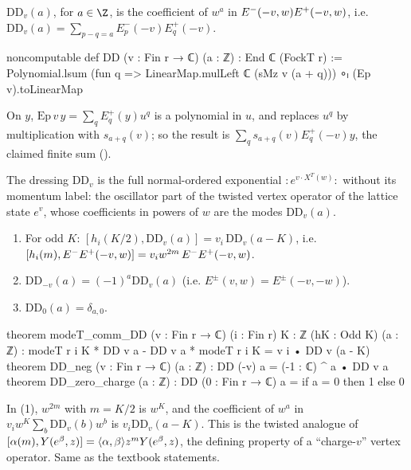 \begin{definition}[Dressing]\label{ch08:def:DD}
$\mathrm{DD}_v(a)$, for $a\in\Z$, is the coefficient of $w^a$ in
$E^{-}(-v,w)E^{+}(-v,w)$, i.e. $\mathrm{DD}_v(a)=\sum_{p-q=a}E^-_p(-v)E^+_q(-v)$.
\end{definition}
\begin{leancode}
noncomputable def DD (v : Fin r → ℂ) (a : ℤ) : End ℂ (FockT r) :=
  Polynomial.lsum (fun q => LinearMap.mulLeft ℂ (sMz v (a + q))) ∘ₗ (Ep v).toLinearMap
\end{leancode}
\begin{dictionary}
On $y$, $\mathrm{Ep}\,v\,y=\sum_qE^+_q(y)u^q$ is a polynomial in $u$, and 
replaces $u^q$ by multiplication with $s_{a+q}(v)$; so the result is
$\sum_qs_{a+q}(v)E^+_q(-v)y$, the claimed finite sum ().
\end{dictionary}

\begin{physics}
The dressing $\mathrm{DD}_v$ is the full normal-ordered exponential $:\!e^{v\cdot X^{T}(w)}\!:$ without its momentum label: the oscillator part of the twisted vertex operator of the lattice state $e^v$, whose coefficients in powers of $w$ are the modes $\mathrm{DD}_v(a)$.
\end{physics}

\begin{proposition}\label{ch08:prop:DD}
\begin{enumerate}
\item For odd $K$: $[h_i(K/2),\mathrm{DD}_v(a)]=v_i\,\mathrm{DD}_v(a-K)$, i.e.
  $[h_i(m),E^{-}E^{+}(-v,w)]=v_iw^{2m}\,E^{-}E^{+}(-v,w)$.
\item $\mathrm{DD}_{-v}(a)=(-1)^a\mathrm{DD}_v(a)$ (i.e. $E^\pm(v,w)=E^\pm(-v,-w)$).
\item $\mathrm{DD}_0(a)=\delta_{a,0}$.
\end{enumerate}
\end{proposition}
\begin{leancode}
theorem modeT_comm_DD (v : Fin r → ℂ) (i : Fin r) {K : ℤ} (hK : Odd K) (a : ℤ) :
    modeT r i K * DD v a - DD v a * modeT r i K = v i • DD v (a - K)
theorem DD_neg (v : Fin r → ℂ) (a : ℤ) : DD (-v) a = (-1 : ℂ) ^ a • DD v a
theorem DD_zero_charge (a : ℤ) : DD (0 : Fin r → ℂ) a = if a = 0 then 1 else 0
\end{leancode}
\begin{dictionary}
In (1), $w^{2m}$ with $m=K/2$ is $w^K$, and the coefficient of $w^a$ in
$v_iw^K\sum_b\mathrm{DD}_v(b)w^b$ is $v_i\mathrm{DD}_v(a-K)$.  This is the twisted analogue of
$[\alpha(m),Y(e^\beta,z)]=\langle \alpha,\beta\rangle z^mY(e^\beta,z)$, the defining property of a
``charge-$v$'' vertex operator.  Same as the textbook statements.
\end{dictionary}

